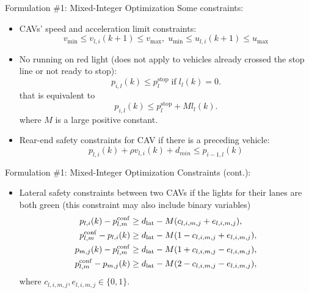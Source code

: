 \documentclass[9pt]{beamer}
\begin{document}
\begin{frame}{Formulation \#1: Mixed-Integer Optimization}
Some constraints:

\begin{itemize}

\item CAVs' speed and acceleration limit constraints:
\begin{equation*}
v_{\min} \le v_{l,i} (k+1) \le  v_{\max}, \; u_{\min} \le u_{l,i} (k+1) \le  u_{\max}    
\end{equation*}

\item No running on red light (does not apply to vehicles already crossed the stop line or not ready to stop):
\begin{equation*}
p_{i,l} (k) \le p_l^{\mathrm{stop}} \; \text{if} \; l_l(k) = 0.
\end{equation*}
that is equivalent to 
\begin{equation*}
p_{i,l} (k) \le p_l^{\mathrm{stop}} + M l_l(k).
\end{equation*}
where $M$ is a large positive constant.

\item Rear-end safety constraints for CAV if there is a preceding vehicle:
\begin{equation*}
p_{l,i} (k) + \rho v_{l,i} (k) + d_{min} \le p_{i-1,l} (k)
\end{equation*}

\end{itemize}
\end{frame}


\begin{frame}{Formulation \#1: Mixed-Integer Optimization}
Constraints (cont.):

\begin{itemize}
\item Lateral safety constraints between two CAVs if the lights for their lanes are both green (this constraint may also include binary variables)
\begin{equation*}
\begin{split}
p_{l,i} (k) - p_{l,m}^{\rm{conf}} & \ge d_{\rm{lat}} - M (c_{l,i,m,j} + e_{l,i,m,j}), \\
p_{l,m}^{\rm{conf}} - p_{l,i} (k) & \ge d_{\rm{lat}} - M (1 - c_{l,i,m,j} + e_{l,i,m,j}), \\
p_{m,j} (k) - p_{l,m}^{\rm{conf}} & \ge d_{\rm{lat}} - M (1 + c_{l,i,m,j} - e_{l,i,m,j}), \\
p_{l,m}^{\rm{conf}} - p_{m,j} (k) & \ge d_{\rm{lat}} - M (2 - c_{l,i,m,j} - e_{l,i,m,j}), 
\end{split}
\end{equation*}
where $c_{l,i,m,j}, e_{l,i,m,j} \in \{0, 1\}$.

\end{itemize}
\end{frame}
\end{document}
